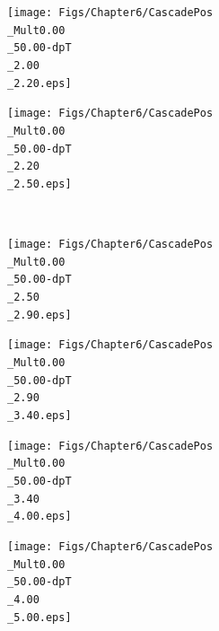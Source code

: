 \begin{landscape}
\begin{figure}[h]
\begin{minipage}[t]{.25\textwidth}
    \end{minipage}
    \hfill
    \begin{minipage}[t]{.25\textwidth}
		\hspace*{-2.5cm}
        \texttt{[image: Figs/Chapter6/CascadePos\\\_Mult0.00\\\_50.00-dpT\\\_2.00\\\_2.20.eps]}
    \end{minipage}
    \hfill
    \begin{minipage}[t]{.25\textwidth}
		\hspace*{-2.5cm}
        \texttt{[image: Figs/Chapter6/CascadePos\\\_Mult0.00\\\_50.00-dpT\\\_2.20\\\_2.50.eps]}
    \end{minipage}  \\
    \begin{minipage}[t]{.25\textwidth}
        \hspace*{-2.5cm}
        \texttt{[image: Figs/Chapter6/CascadePos\\\_Mult0.00\\\_50.00-dpT\\\_2.50\\\_2.90.eps]}
    \end{minipage}
    \hfill
    \begin{minipage}[t]{.25\textwidth}
        \hspace*{-2.5cm}
        \texttt{[image: Figs/Chapter6/CascadePos\\\_Mult0.00\\\_50.00-dpT\\\_2.90\\\_3.40.eps]}
    \end{minipage}
    \hfill
    \begin{minipage}[t]{.25\textwidth}
		\hspace*{-2.5cm}
        \texttt{[image: Figs/Chapter6/CascadePos\\\_Mult0.00\\\_50.00-dpT\\\_3.40\\\_4.00.eps]}
    \end{minipage}
    \hfill
    \begin{minipage}[t]{.25\textwidth}
		\hspace*{-2.5cm}
        \texttt{[image: Figs/Chapter6/CascadePos\\\_Mult0.00\\\_50.00-dpT\\\_4.00\\\_5.00.eps]}

\end{minipage}
\end{figure}
\end{landscape}
